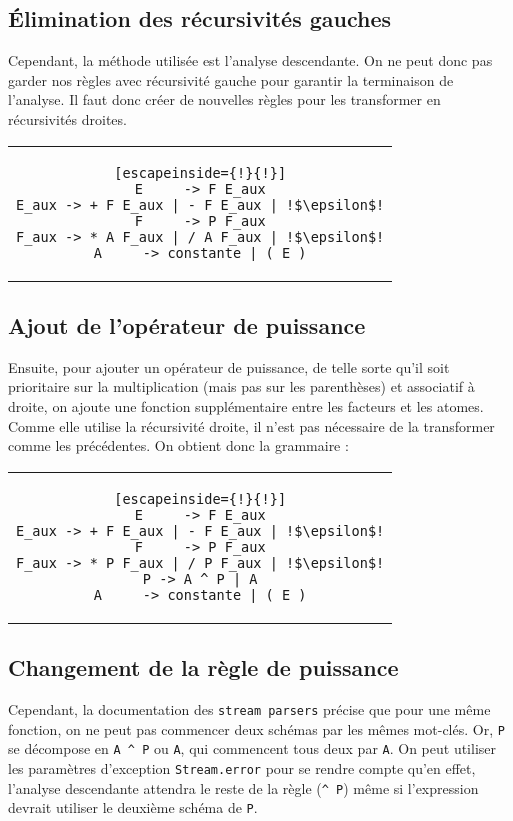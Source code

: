 \documentclass[11pt]{article}
\begin{document}
\subsection{Élimination des récursivités gauches}
Cependant, la méthode utilisée est l'analyse descendante. On ne peut donc pas garder nos règles avec récursivité gauche pour garantir la terminaison de l'analyse. Il faut donc créer de nouvelles règles pour les transformer en récursivités droites.
\begin{center}
\begin{tabular}{c}
\begin{lstlisting}[escapeinside={!}{!}]
E     -> F E_aux
E_aux -> + F E_aux | - F E_aux | !$\epsilon$!
F     -> P F_aux
F_aux -> * A F_aux | / A F_aux | !$\epsilon$!
A     -> constante | ( E )
\end{lstlisting}
\end{tabular}
\end{center}


\subsection{Ajout de l'opérateur de puissance}
Ensuite, pour ajouter un opérateur de puissance, de telle sorte qu'il soit prioritaire sur la multiplication (mais pas sur les parenthèses) et associatif à droite, on ajoute une fonction supplémentaire entre les facteurs et les atomes. Comme elle utilise la récursivité droite, il n'est pas nécessaire de la transformer comme les précédentes. On obtient donc la grammaire : 
\begin{center}
\begin{tabular}{c}
\begin{lstlisting}[escapeinside={!}{!}]
E     -> F E_aux
E_aux -> + F E_aux | - F E_aux | !$\epsilon$!
F     -> P F_aux
F_aux -> * P F_aux | / P F_aux | !$\epsilon$!
P -> A ^ P | A
A     -> constante | ( E )
\end{lstlisting}
\end{tabular}
\end{center}

\subsection{Changement de la règle de puissance}
Cependant, la documentation des \texttt{stream parsers} précise que pour une même fonction, on ne peut pas commencer deux schémas par les mêmes mot-clés. Or, \lstinline{P} se décompose en \lstinline{A ^ P} ou \lstinline{A}, qui commencent tous deux par \lstinline{A}. On peut utiliser les paramètres d'exception \texttt{Stream.error} pour se rendre compte qu'en effet, l'analyse descendante attendra le reste de la règle (\lstinline{^ P}) même si l'expression devrait utiliser le deuxième schéma de \lstinline{P}.
\end{document}

